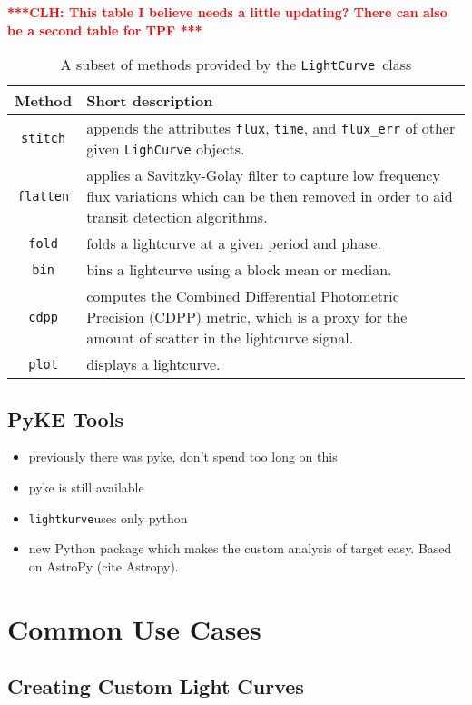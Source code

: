 \documentclass[twocolumn]{aastex62}
\newcommand{\lightkurve}{\texttt{lightkurve}}
\newcommand{\LightCurve}{\texttt{LightCurve}}
\newcommand{\clh}[1]{\textcolor{red}{ \textbf{***CLH: #1 ***}}}
\begin{document}
\clh{This table I believe needs a little updating? There can also be a second table for TPF}
\begin{table}[!htb]
    \centering
    \caption{A subset of methods provided by the \LightCurve~class}
    \begin{tabular}{cp{6.5cm}}
        \hline
        \textbf{Method} & \textbf{Short description} \\
        \hline
        \texttt{stitch} & appends the attributes \texttt{flux},
        \texttt{time}, and \texttt{flux\_err} of other given
        \texttt{LighCurve} objects.\\
        \texttt{flatten} & applies a Savitzky-Golay filter to capture
        low frequency flux variations which can be then removed in order
        to aid transit detection algorithms.\\
        \texttt{fold} & folds a lightcurve at a given period and phase.\\
        \texttt{bin} &  bins a lightcurve using a block mean or median.\\
        \texttt{cdpp} &  computes the Combined Differential Photometric
        Precision (CDPP) metric, which is a proxy for the amount of
        scatter in the lightcurve signal. \\
        \texttt{plot} & displays a lightcurve.
    \end{tabular}
    \label{tab:methods}
\end{table}

\subsection{PyKE Tools}
\begin{itemize}
\item previously there was pyke, don't spend too long on this
\item pyke is still available
\item \lightkurve uses only python
\item  new Python package which makes the custom analysis of target easy.  Based on AstroPy (cite Astropy).
\end{itemize}


\section{Common Use Cases}

\subsection{Creating Custom Light Curves}
\end{document}
